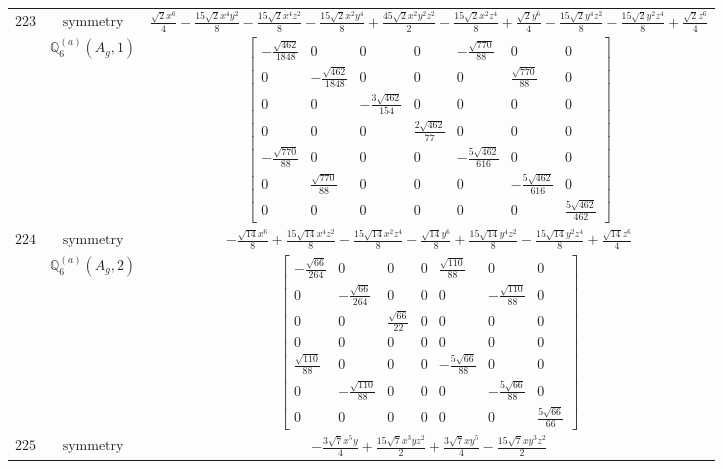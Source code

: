 \documentclass[fleqn,8pt,landscape]{jsarticle}
\begin{document}
\begin{longtable}{ccc}
$ 223 $ & $ \text{symmetry} $ & $ \frac{\sqrt{2} x^{6}}{4} - \frac{15 \sqrt{2} x^{4} y^{2}}{8} - \frac{15 \sqrt{2} x^{4} z^{2}}{8} - \frac{15 \sqrt{2} x^{2} y^{4}}{8} + \frac{45 \sqrt{2} x^{2} y^{2} z^{2}}{2} - \frac{15 \sqrt{2} x^{2} z^{4}}{8} + \frac{\sqrt{2} y^{6}}{4} - \frac{15 \sqrt{2} y^{4} z^{2}}{8} - \frac{15 \sqrt{2} y^{2} z^{4}}{8} + \frac{\sqrt{2} z^{6}}{4} $ \\
$  $ & $ \mathbb{Q}_{6}^{(a)}(A_{g},1) $ & $ \begin{bmatrix} - \frac{\sqrt{462}}{1848} & 0 & 0 & 0 & - \frac{\sqrt{770}}{88} & 0 & 0 \\ 0 & - \frac{\sqrt{462}}{1848} & 0 & 0 & 0 & \frac{\sqrt{770}}{88} & 0 \\ 0 & 0 & - \frac{3 \sqrt{462}}{154} & 0 & 0 & 0 & 0 \\ 0 & 0 & 0 & \frac{2 \sqrt{462}}{77} & 0 & 0 & 0 \\ - \frac{\sqrt{770}}{88} & 0 & 0 & 0 & - \frac{5 \sqrt{462}}{616} & 0 & 0 \\ 0 & \frac{\sqrt{770}}{88} & 0 & 0 & 0 & - \frac{5 \sqrt{462}}{616} & 0 \\ 0 & 0 & 0 & 0 & 0 & 0 & \frac{5 \sqrt{462}}{462} \end{bmatrix} $ \\ \hline
$ 224 $ & $ \text{symmetry} $ & $ - \frac{\sqrt{14} x^{6}}{8} + \frac{15 \sqrt{14} x^{4} z^{2}}{8} - \frac{15 \sqrt{14} x^{2} z^{4}}{8} - \frac{\sqrt{14} y^{6}}{8} + \frac{15 \sqrt{14} y^{4} z^{2}}{8} - \frac{15 \sqrt{14} y^{2} z^{4}}{8} + \frac{\sqrt{14} z^{6}}{4} $ \\
$  $ & $ \mathbb{Q}_{6}^{(a)}(A_{g},2) $ & $ \begin{bmatrix} - \frac{\sqrt{66}}{264} & 0 & 0 & 0 & \frac{\sqrt{110}}{88} & 0 & 0 \\ 0 & - \frac{\sqrt{66}}{264} & 0 & 0 & 0 & - \frac{\sqrt{110}}{88} & 0 \\ 0 & 0 & \frac{\sqrt{66}}{22} & 0 & 0 & 0 & 0 \\ 0 & 0 & 0 & 0 & 0 & 0 & 0 \\ \frac{\sqrt{110}}{88} & 0 & 0 & 0 & - \frac{5 \sqrt{66}}{88} & 0 & 0 \\ 0 & - \frac{\sqrt{110}}{88} & 0 & 0 & 0 & - \frac{5 \sqrt{66}}{88} & 0 \\ 0 & 0 & 0 & 0 & 0 & 0 & \frac{5 \sqrt{66}}{66} \end{bmatrix} $ \\ \hline
$ 225 $ & $ \text{symmetry} $ & $ - \frac{3 \sqrt{7} x^{5} y}{4} + \frac{15 \sqrt{7} x^{3} y z^{2}}{2} + \frac{3 \sqrt{7} x y^{5}}{4} - \frac{15 \sqrt{7} x y^{3} z^{2}}{2} $ \\

\end{longtable}
\end{document}
